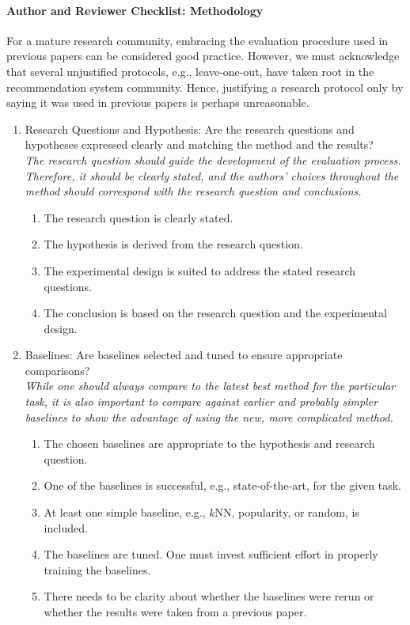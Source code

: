 \paragraph{Author and Reviewer Checklist: Methodology}

For a mature research community, embracing the evaluation procedure used in previous papers can be considered good practice. However, we must acknowledge that several unjustified protocols, e.g., leave-one-out, have taken root in the recommendation system community. Hence, justifying a research protocol only by saying it was used in previous papers is perhaps unreasonable.

\begin{enumerate}
    \item Research Questions and Hypothesis: 
    Are the research questions and hypotheses expressed clearly and matching the method and the results? \\
    \emph{The research question should guide the development of the evaluation process. Therefore, it should be clearly stated, and the authors' choices throughout the method should correspond with the research question and conclusions.}
    \begin{enumerate} [label*=\arabic*.]
        \item The research question is clearly stated.
        \item The hypothesis is derived from the research question.
        \item The experimental design is suited to address the stated research questions.
        \item The conclusion is based on the research question and the experimental design.
    \end{enumerate}
    
    \item Baselines: 
    Are baselines selected and tuned to ensure appropriate comparisons? \\
    \emph{While one should always compare to the latest best method for the particular task, it is also important to compare against earlier and probably simpler baselines to show the advantage of using the new, more complicated method.}
    \begin{enumerate} [label*=\arabic*.]
        \item The chosen baselines are appropriate to the hypothesis and research question.
        \item One of the baselines is successful, e.g., state-of-the-art, for the given task. 
        \item At least one simple baseline, e.g., $k$NN, popularity, or random, is included.
        \item The baselines are tuned. One must invest sufficient effort in properly training the baselines. 
        \item There needs to be clarity about whether the baselines were rerun or whether the results were taken from a previous paper.
    \end{enumerate}



\end{enumerate}
